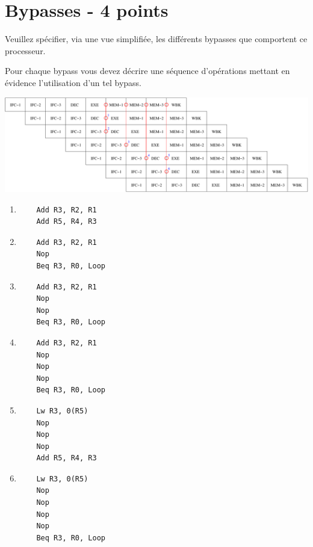 %
%

\section{Bypasses - 4 points}

Veuillez sp\'ecifier, via une vue simplifi\'ee, les diff\'erents bypasses
que comportent ce processeur.

Pour chaque bypass vous devez d\'ecrire une s\'equence d'op\'erations
mettant en \'evidence l'utilisation d'un tel bypass.

\begin{correction}

  \begin{center}
    \includegraphics[scale=0.6]{figures/correction-bypasses.pdf}
  \end{center}

  \begin{enumerate}
    \item
      \begin{verbatim}
	Add R3, R2, R1
	Add R5, R4, R3
      \end{verbatim}
    \item
      \begin{verbatim}
	Add R3, R2, R1
	Nop
	Beq R3, R0, Loop
      \end{verbatim}
    \item
      \begin{verbatim}
	Add R3, R2, R1
	Nop
	Nop
	Beq R3, R0, Loop
      \end{verbatim}
    \item
      \begin{verbatim}
	Add R3, R2, R1
	Nop
	Nop
	Nop
	Beq R3, R0, Loop
      \end{verbatim}
    \item
      \begin{verbatim}
	Lw R3, 0(R5)
	Nop
	Nop
	Nop
	Add R5, R4, R3
      \end{verbatim}
    \item
      \begin{verbatim}
	Lw R3, 0(R5)
	Nop
	Nop
	Nop
	Nop
	Beq R3, R0, Loop
      \end{verbatim}
  \end{enumerate}

\end{correction}

